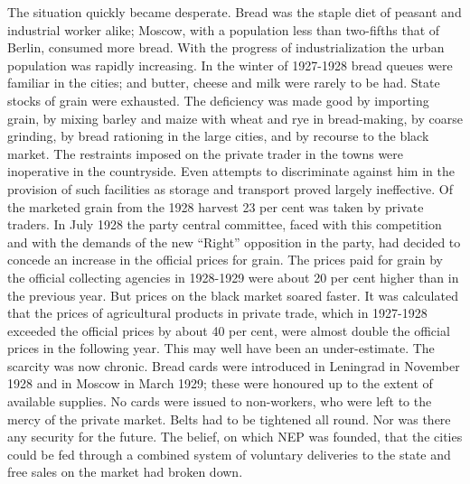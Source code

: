 The situation quickly became desperate. Bread was the staple diet of peasant and industrial worker alike; Moscow, with a population less than two-fifths that of Berlin, consumed more bread. With the progress of industrialization the urban population was rapidly increasing. In the winter of 1927-1928 bread queues were familiar in the cities; and butter, cheese and milk were rarely to be had. State stocks of grain were exhausted. The deficiency was made good by importing grain, by mixing barley and maize with wheat and rye in bread-making, by coarse grinding, by bread rationing in the large cities, and by recourse to the black market. The restraints imposed on the private trader in the towns were inoperative in the countryside. Even attempts to discriminate against him in the provision of such facilities as storage and transport proved largely ineffective. Of the marketed grain from the 1928 harvest 23 per cent was taken by private traders. In July 1928 the party central committee, faced with this competition and with the demands of the new ``Right'' opposition in the party, had decided to concede an increase in the official prices for grain. The prices paid for grain by the official collecting agencies in 1928-1929 were about 20 per cent higher than in the previous year. But prices on the black market soared faster. It was calculated that the prices of agricultural products in private trade, which in 1927-1928 exceeded the official prices by about 40 per cent, were almost double the official prices in the following year. This may well have been an under-estimate. The scarcity was now chronic. Bread cards were introduced in Leningrad in November 1928 and in Moscow in March 1929; these were honoured up to the extent of available supplies. No cards were issued to non-workers, who were left to the mercy of the private market. Belts had to be tightened all round. Nor was there any security for the future. The belief, on which NEP was founded, that the cities could be fed through a combined system of voluntary deliveries to the state and free sales on the market had broken down. 

